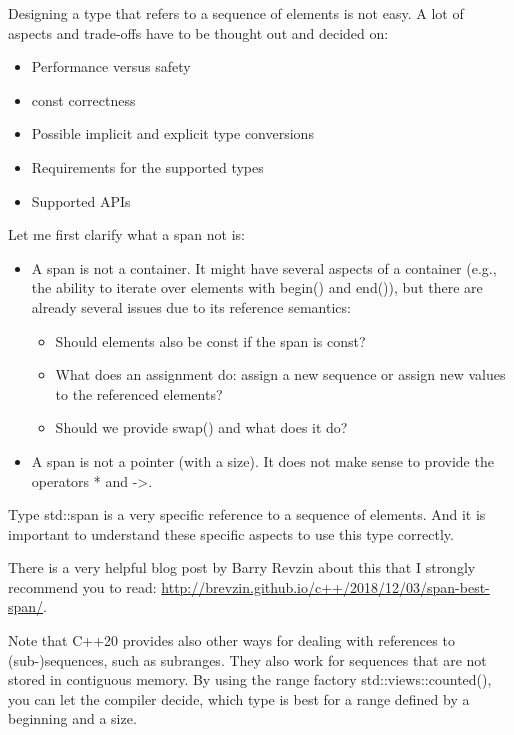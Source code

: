 
Designing a type that refers to a sequence of elements is not easy. A lot of aspects and trade-offs have to be thought out and decided on:

\begin{itemize}
\item
Performance versus safety

\item
const correctness

\item
Possible implicit and explicit type conversions

\item
Requirements for the supported types

\item
Supported APIs
\end{itemize}

Let me first clarify what a span not is:

\begin{itemize}
\item
A span is not a container. It might have several aspects of a container (e.g., the ability to iterate over elements with begin() and end()), but there are already several issues due to its reference semantics:

\begin{itemize}
\item
Should elements also be const if the span is const?

\item
What does an assignment do: assign a new sequence or assign new values to the referenced elements?

\item
Should we provide swap() and what does it do?
\end{itemize}

\item
A span is not a pointer (with a size). It does not make sense to provide the operators * and ->.
\end{itemize}

Type std::span is a very specific reference to a sequence of elements. And it is important to understand these specific aspects to use this type correctly.

There is a very helpful blog post by Barry Revzin about this that I strongly recommend you to read: \url{http://brevzin.github.io/c++/2018/12/03/span-best-span/}.

Note that C++20 provides also other ways for dealing with references to (sub-)sequences, such as subranges. They also work for sequences that are not stored in contiguous memory. By using the range factory std::views::counted(), you can let the compiler decide, which type is best for a range defined by a beginning and a size.

